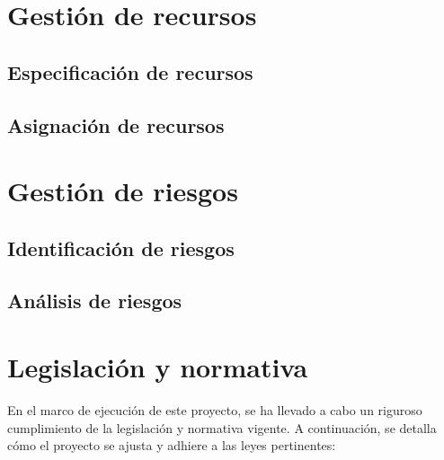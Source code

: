 \documentclass[12pt,a4paper,onecolumn,oneside]{report}
\begin{document}
\section{Gestión de recursos}
\label{Gestión de recursos}

\subsection{Especificación de recursos}
\label{Especificación de recursos}

\subsection{Asignación de recursos}
\label{asignacion de recursos}



\section{Gestión de riesgos}
\subsection{Identificación de riesgos}
\subsection{Análisis de riesgos}

\section{Legislación y normativa}

En el marco de ejecución de este proyecto, se ha llevado a cabo un riguroso cumplimiento de la legislación y normativa vigente. A continuación, se detalla cómo el proyecto se ajusta y adhiere a las leyes pertinentes:
\end{document}
